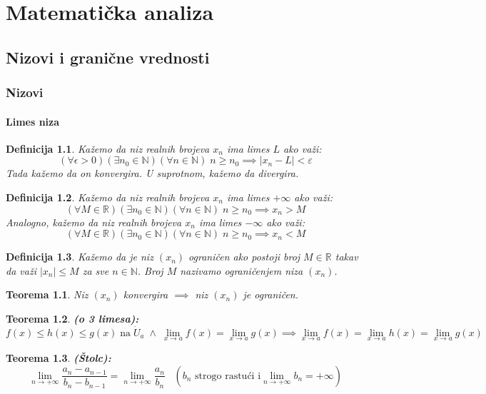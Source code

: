 \documentclass[a4paper,12pt,twoside]{report}
\newtheorem{theorem}{Teorema}[section]
\newtheorem{definition}{Definicija}[section]
\numberwithin{algorithm}{section}
\begin{document}
\part{Matematička analiza}

\chapter{Nizovi i granične vrednosti}
\section{Nizovi}

\subsection{Limes niza}
\begin{definition}
    Kažemo da niz realnih brojeva $x_n$ ima limes $L$ ako važi:
    \[ (\forall \epsilon > 0)(\exists n_0 \in \mathbb{N})(\forall n \in \mathbb{N}) \; n \geq n_0 \implies |x_n - L| < \varepsilon \]
    Tada kažemo da on konvergira. U suprotnom, kažemo da divergira.
\end{definition}
\begin{definition}
    Kažemo da niz realnih brojeva $x_n$ ima limes $+\infty$ ako važi:
    \[ (\forall M \in \mathbb{R})(\exists n_0 \in \mathbb{N})(\forall n \in \mathbb{N}) \; n \geq n_0 \implies x_n > M \]
    Analogno, kažemo da niz realnih brojeva $x_n$ ima limes $-\infty$ ako važi:
    \[ (\forall M \in \mathbb{R})(\exists n_0 \in \mathbb{N})(\forall n \in \mathbb{N}) \; n \geq n_0 \implies x_n < M \]
\end{definition}
\begin{definition}
    Kažemo da je niz $(x_n)$ ograničen ako postoji broj $M \in \mathbb{R}$ takav da važi $|x_n| \leq M$ za sve $n \in \mathbb{N}$. Broj $M$ nazivamo ograničenjem niza $(x_n)$.
\end{definition}
\begin{theorem}
    Niz $(x_n)$ konvergira $\implies$ niz $(x_n)$ je ograničen.
\end{theorem}
\begin{theorem}
    \textbf{(o 3 limesa): }\[f(x) \leq h(x) \leq g(x) \;\text{na}\; \dot{U}_a \;\land\; \lim_{x \to a} f(x) = \lim_{x \to a} g(x) \implies \lim_{x \to a} f(x) = \lim_{x \to a} h(x) = \lim_{x \to a} g(x)\]
\end{theorem}
\begin{theorem}
    \textbf{(Štolc):} 
    \[ \lim_{n\to +\infty} \frac{a_n-a_{n-1}}{b_n-b_{n-1}} = \lim_{n\to +\infty} \frac{a_n}{b_n}\;\;\; (b_n \text{ strogo rastući i} \lim_{n\to +\infty} b_n = +\infty) \]
\end{theorem}
\end{document}
